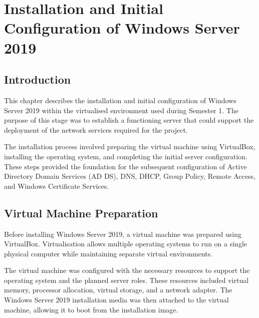 \chapter{Installation and Initial Configuration of Windows Server 2019}

\section{Introduction}

This chapter describes the installation and initial configuration of Windows Server 2019 within the virtualised environment used during Semester 1. The purpose of this stage was to establish a functioning server that could support the deployment of the network services required for the project.

The installation process involved preparing the virtual machine using VirtualBox, installing the operating system, and completing the initial server configuration. These steps provided the foundation for the subsequent configuration of Active Directory Domain Services (AD DS), DNS, DHCP, Group Policy, Remote Access, and Windows Certificate Services.

\section{Virtual Machine Preparation}

Before installing Windows Server 2019, a virtual machine was prepared using VirtualBox. Virtualisation allows multiple operating systems to run on a single physical computer while maintaining separate virtual environments.

The virtual machine was configured with the necessary resources to support the operating system and the planned server roles. These resources included virtual memory, processor allocation, virtual storage, and a network adapter. The Windows Server 2019 installation media was then attached to the virtual machine, allowing it to boot from the installation image.


